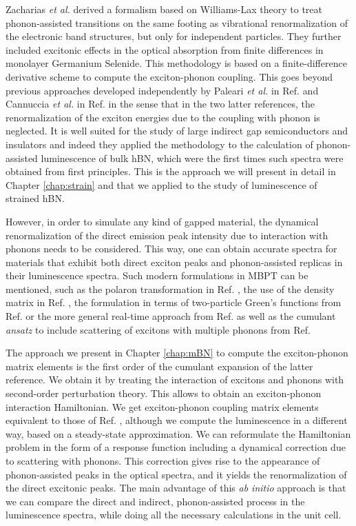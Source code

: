 Zacharias \textit{et al.} derived a formalism based on Williams-Lax theory\cite{williams1951theoretical,lax1952franck} to treat phonon-assisted transitions on the same footing as vibrational renormalization of the electronic band structures, but only for independent particles.\cite{zacharias2016one} They further included excitonic effects in the optical absorption from finite differences \cite{huang2021exciton} in monolayer Germanium Selenide. This methodology is based on a finite-difference derivative scheme to compute the exciton-phonon coupling. This goes beyond previous approaches developed independently by Paleari \textit{et al.} in Ref. \cite{paleari2019exciton} and Cannuccia \textit{et al.} in Ref. \cite{cannuccia2019theory} in the sense that in the two latter references, the renormalization of the exciton energies due to the coupling with phonon is neglected. It is well suited for the study of large indirect gap semiconductors and insulators and indeed they applied the methodology to the calculation of phonon-assisted luminescence of bulk hBN, which were the first times such spectra were obtained from first principles. This is the approach we will present in detail in Chapter \ref{chap:strain} and that we applied to the study of luminescence of strained hBN. 

However, in order to simulate any kind of gapped material, the dynamical renormalization of the direct emission peak intensity due to interaction with phonons needs to be considered. This way, one can obtain accurate spectra for materials that exhibit both direct exciton peaks and phonon-assisted replicas in their luminescence spectra. Such modern formulations in \acrshort{MBPT} can be mentioned, such as the polaron transformation in Ref. \cite{feldtmann2009phonon}, the use of the density matrix in Ref. \cite{brem2020phonon}, the formulation in terms of two-particle Green's functions from Ref. \cite{antonius2017theory} or the more general real-time approach from Ref. \cite{paleari2022exciton} as well as the cumulant \textit{ansatz} to include scattering of excitons with multiple phonons from Ref. \cite{cudazzo2020first}

The approach we present in Chapter \ref{chap:mBN} to compute the exciton-phonon matrix elements is the first order of the cumulant expansion of the latter reference. We obtain it by treating the interaction of excitons and phonons with second-order perturbation theory. This allows to obtain an exciton-phonon interaction Hamiltonian. We get exciton-phonon coupling matrix elements equivalent to those of Ref. \cite{chen2020exciton}, although we compute the luminescence in a different way, based on a steady-state approximation.
We can reformulate the Hamiltonian problem in the form of a response function including a dynamical correction due to scattering with phonons. This correction gives rise to the appearance of phonon-assisted peaks in the optical spectra, and it yields the renormalization of the direct excitonic peaks. The main advantage of this \textit{ab initio} approach is that we can compare the direct and indirect, phonon-assisted process in the luminescence spectra, while doing all the necessary calculations in the unit cell.


